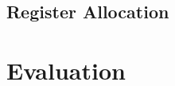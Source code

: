 \documentclass[mathserif,10pt]{beamer}
\begin{document}
\subsection{Register Allocation}
\frame
{
  \frametitle{\subsecname}
  \begin{figure}[h]
  \centering
  \end{figure}
}

\section{Evaluation}
\end{document}
